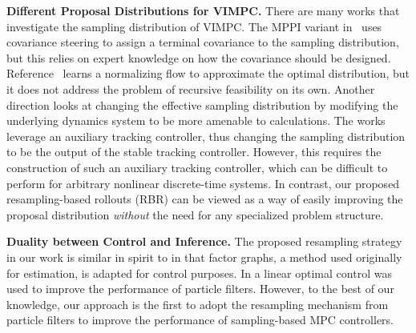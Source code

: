 \beforetextbf{}

\noindent\textbf{Different Proposal Distributions for VIMPC.}
There are many works that investigate the sampling distribution of VIMPC.
The MPPI variant in~\cite{CCMPPI} uses covariance steering to assign a terminal covariance to the sampling distribution, but this relies on expert knowledge on how the covariance should be designed.
Reference~\cite{power2022variational} learns a normalizing flow to approximate the optimal distribution, but it does not address the problem of recursive feasibility on its own.
Another direction looks at changing the effective sampling distribution by modifying the underlying dynamics system to be more amenable to calculations.
The works \cite{TubeMPPI, L1Adaptive} leverage an auxiliary tracking controller, thus changing the sampling distribution to be the output of the stable tracking controller. However, this requires the construction of such an auxiliary tracking controller, which can be difficult to perform for arbitrary nonlinear discrete-time systems.
In contrast, our proposed resampling-based rollouts (RBR) can be viewed as a way of easily improving the proposal distribution \textit{without} the need for any specialized problem structure.

\beforetextbf{}

\noindent\textbf{Duality between Control and Inference.}
The proposed resampling strategy in our work is similar in spirit to \cite{xie2020factor,qadri2022incopt} in that
factor graphs, a method used originally for estimation, is adapted for control purposes.
In \cite{zhang2023optimal} a linear optimal control was used to improve the performance of particle filters.
However, to the best of our knowledge, our approach is the first to adopt the resampling mechanism from particle filters
to improve the performance of sampling-based MPC controllers.

\beforetextbf{}

